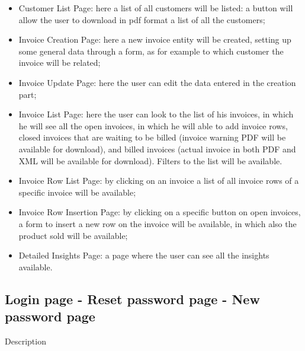 \begin{itemize}
    \item Customer List Page: here a list of all customers will be listed: a button will allow the user to download in pdf format a list of all the customers;
    \item Invoice Creation Page: here a new invoice entity will be created, setting up some general data through a form, as for example to which customer the invoice will be related;
    \item Invoice Update Page: here the user can edit the data entered in the creation part;
    \item Invoice List Page: here the user can look to the list of his invoices, in which he will see all the open invoices, in which he will able to add invoice rows, closed invoices that are waiting to be billed (invoice warning PDF will be available for download), and billed invoices (actual invoice in both PDF and XML will be available for download). Filters to the list will be available.
    \item Invoice Row List Page: by clicking on an invoice a list of all invoice rows of a specific invoice will be available;
    \item Invoice Row Insertion Page: by clicking on a specific button on open invoices, a form to insert a new row on the invoice will be available, in which also the product sold will be available;
    \item Detailed Insights Page: a page where the user can see all the insights available.
\end{itemize}
\newpage
\subsection{Login page - Reset password page - New password page}

Description


